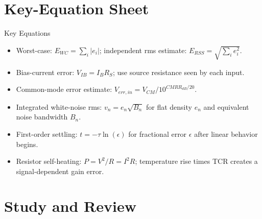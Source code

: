 \documentclass[10pt,letterpaper]{article}
\begin{document}
\section{Key-Equation Sheet}
\begin{CornellExamBox}{Key Equations}
\begin{itemize}
  \item Worst-case: $E_{WC}=\sum_i |e_i|$; independent rms estimate: $E_{RSS}=\sqrt{\sum_i e_i^2}$.
  \item Bias-current error: $V_{IB}=I_B R_S$; use source resistance seen by each input.
  \item Common-mode error estimate: $V_{err,in}=V_{CM}/10^{CMRR_{dB}/20}$.
  \item Integrated white-noise rms: $v_n=e_n\sqrt{B_n}$ for flat density $e_n$ and equivalent noise bandwidth $B_n$.
  \item First-order settling: $t=-\tau\ln(\epsilon)$ for fractional error $\epsilon$ after linear behavior begins.
  \item Resistor self-heating: $P=V^2/R=I^2R$; temperature rise times TCR creates a signal-dependent gain error.
\end{itemize}\end{CornellExamBox}
\section{Study and Review}
\end{document}
